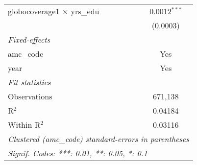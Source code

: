 \begin{tabular}{lc}
   globocoverage1 $\times$ yrs\_edu   & 0.0012$^{***}$\\   
                                      & (0.0003)\\   
   \midrule
   \emph{Fixed-effects}\\
   amc\_code                          & Yes\\  
   year                               & Yes\\  
   \midrule
   \emph{Fit statistics}\\
   Observations                       & 671,138\\  
   R$^2$                              & 0.04184\\  
   Within R$^2$                       & 0.03116\\  
   \midrule \midrule
   \multicolumn{2}{l}{\emph{Clustered (amc\_code) standard-errors in parentheses}}\\
   \multicolumn{2}{l}{\emph{Signif. Codes: ***: 0.01, **: 0.05, *: 0.1}}\\
\end{tabular}
\par\endgroup


